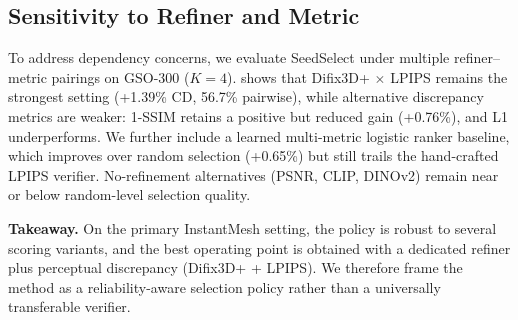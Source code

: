 \subsection{Sensitivity to Refiner and Metric}
\label{sec:sensitivity-refiner-metric}

To address dependency concerns, we evaluate SeedSelect under multiple refiner--metric pairings on GSO-300 ($K{=}4$).
 shows that Difix3D+ $\times$ LPIPS remains the strongest setting (+1.39\% CD, 56.7\% pairwise), while alternative discrepancy metrics are weaker: 1-SSIM retains a positive but reduced gain (+0.76\%), and L1 underperforms.
We further include a learned multi-metric logistic ranker baseline, which improves over random selection (+0.65\%) but still trails the hand-crafted LPIPS verifier.
No-refinement alternatives (PSNR, CLIP, DINOv2) remain near or below random-level selection quality.



\noindent\textbf{Takeaway.}
On the primary InstantMesh setting, the policy is robust to several scoring variants, and the best operating point is obtained with a dedicated refiner plus perceptual discrepancy (Difix3D+ + LPIPS). We therefore frame the method as a reliability-aware selection policy rather than a universally transferable verifier.
